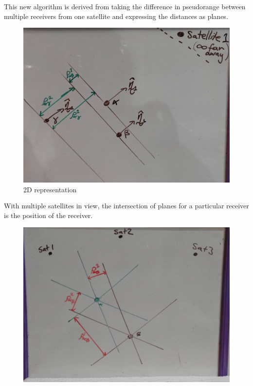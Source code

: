 This new algorithm is derived from taking the difference in pseudorange between multiple receivers from one satellite and expressing the distances as planes.
\begin{figure}[h]
\centering
\caption{2D representation}
\label{fig:overall_singleS_multiR}
\includegraphics[width=0.7\linewidth]{ChapterLiteratureReview/overall_singleS_multiR.jpg}
\end{figure}

With multiple satellites in view, the intersection of planes for a particular receiver is the position of the receiver.
\begin{figure}[h]
\centering
\caption{}
\label{fig:overall_multiS_duelR}
\includegraphics[width=0.7\linewidth]{ChapterLiteratureReview/overall_multiS_duelR.jpg}
\end{figure}

